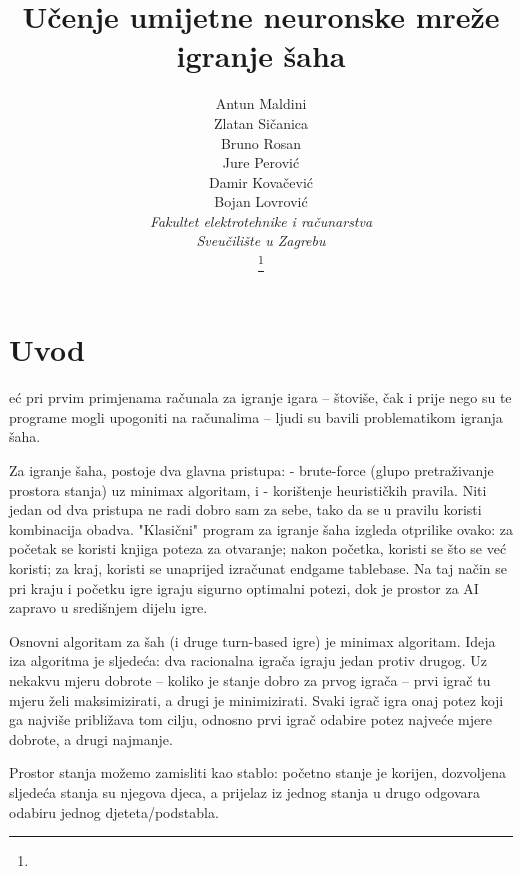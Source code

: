 \documentclass[journal]{IEEEtran}
\begin{document}
\title{Učenje umijetne neuronske mreže igranje šaha}

\author{

Antun Maldini\\
Zlatan Sičanica\\
Bruno Rosan\\
Jure Perović\\
Damir Kovačević\\
Bojan Lovrović\\

\textit{Fakultet elektrotehnike i računarstva}\\
\textit{Sveučilište u Zagrebu}\\

\thanks{}
}

\maketitle

\section{Uvod}
eć pri prvim primjenama računala za igranje igara -- štoviše, čak i
prije nego su te programe mogli upogoniti na računalima -- ljudi su bavili
problematikom igranja šaha.

Za igranje šaha, postoje dva glavna pristupa:
 - brute-force (glupo pretraživanje prostora stanja) uz minimax algoritam, i
 - korištenje heurističkih pravila.
Niti jedan od dva pristupa ne radi dobro sam za sebe, tako da se u pravilu
koristi kombinacija obadva.
"Klasični" program za igranje šaha izgleda otprilike ovako: za početak
se koristi knjiga poteza za otvaranje; nakon početka, koristi se što se
već koristi; za kraj, koristi se unaprijed izračunat endgame tablebase.
Na taj način se pri kraju i početku igre igraju sigurno optimalni potezi,
dok je prostor za AI zapravo u središnjem dijelu igre.

Osnovni algoritam za šah (i druge turn-based igre) je minimax algoritam.
Ideja iza algoritma je sljedeća: dva racionalna igrača igraju jedan protiv
drugog. Uz nekakvu mjeru dobrote -- koliko je stanje dobro za prvog igrača
-- prvi igrač tu mjeru želi maksimizirati, a drugi je minimizirati. Svaki
igrač igra onaj potez koji ga najviše približava tom cilju, odnosno prvi
igrač odabire potez najveće mjere dobrote, a drugi najmanje.

Prostor stanja možemo zamisliti kao stablo: početno stanje je korijen,
dozvoljena sljedeća stanja su njegova djeca, a prijelaz iz jednog stanja
u drugo odgovara odabiru jednog djeteta/podstabla.
\end{document}
